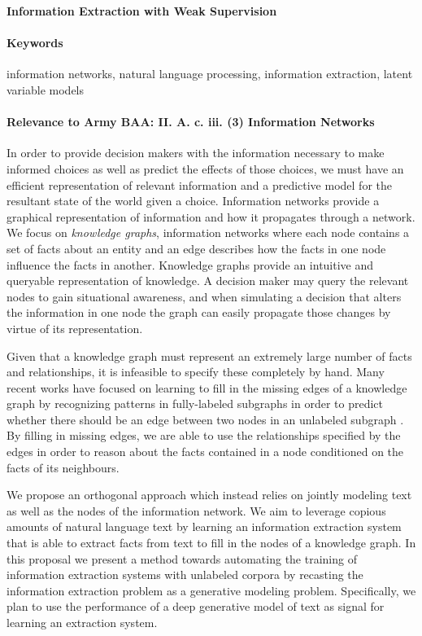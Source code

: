 \documentclass[11pt]{article}
\begin{document}

\begin{center}
\textbf{Information Extraction with Weak Supervision}
\end{center}

\paragraph{Keywords}
information networks, natural language processing, information extraction, latent variable models

\paragraph{Relevance to Army BAA: II. A. c. iii. (3) Information Networks}
In order to provide decision makers with the information
necessary to make informed choices as well as predict the effects of those choices,
we must have an efficient representation of relevant information and a predictive model
for the resultant state of the world given a choice.
Information networks provide a graphical representation of information and how it
propagates through a network.
We focus on \textit{knowledge graphs}, information networks where each node contains a set of facts
about an entity and an edge describes how the facts in one node influence the facts in another.
Knowledge graphs provide an intuitive and queryable representation of knowledge.
A decision maker may query the relevant nodes to gain situational awareness, and
when simulating a decision that alters the information in one node
the graph can easily propagate those changes by virtue of its representation.

Given that a knowledge graph must represent an extremely large number of facts and relationships,
it is infeasible to specify these completely by hand.
Many recent works have focused on learning to fill in the missing edges of a knowledge graph
by recognizing patterns in fully-labeled subgraphs in order to predict whether there should
be an edge between two nodes in an unlabeled subgraph \citep{chen2018diva}.
By filling in missing edges, we are able to use the relationships specified by the edges
in order to reason about the facts contained in a node conditioned on the facts of its
neighbours.

We propose an orthogonal approach which instead relies on jointly modeling
text as well as the nodes of the information network.
We aim to leverage copious amounts of natural language text by
learning an information extraction system that is able to 
extract facts from text to fill in the nodes of a knowledge graph.
In this proposal we present a method towards automating the
training of information extraction systems with unlabeled corpora
by recasting the information extraction problem as a generative modeling problem.
Specifically, we plan to use the performance of a deep generative model of text 
as signal for learning an extraction system.
\end{document}

